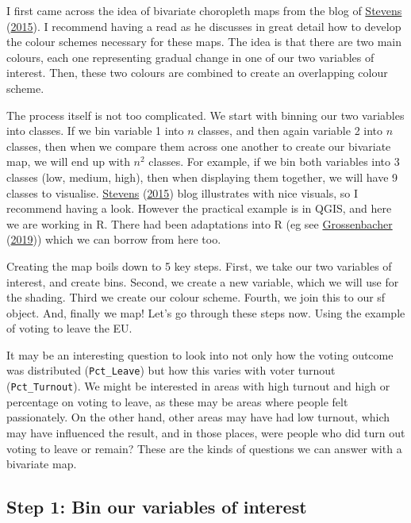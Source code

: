 \documentclass[
]{book}
\begin{document}
I first came across the idea of bivariate choropleth maps from the blog of \protect\hyperlink{ref-Stevens_2015}{Stevens} (\protect\hyperlink{ref-Stevens_2015}{2015}). I recommend having a read as he discusses in great detail how to develop the colour schemes necessary for these maps. The idea is that there are two main colours, each one representing gradual change in one of our two variables of interest. Then, these two colours are combined to create an overlapping colour scheme.

The process itself is not too complicated. We start with binning our two variables into classes. If we bin variable 1 into \(n\) classes, and then again variable 2 into \(n\) classes, then when we compare them across one another to create our bivariate map, we will end up with \(n^2\) classes. For example, if we bin both variables into 3 classes (low, medium, high), then when displaying them together, we will have 9 classes to visualise. \protect\hyperlink{ref-Stevens_2015}{Stevens} (\protect\hyperlink{ref-Stevens_2015}{2015}) blog illustrates with nice visuals, so I recommend having a look. However the practical example is in QGIS, and here we are working in R. There had been adaptations into R (eg see \protect\hyperlink{ref-Grossenbacher_2019}{Grossenbacher} (\protect\hyperlink{ref-Grossenbacher_2019}{2019})) which we can borrow from here too.

Creating the map boils down to 5 key steps. First, we take our two variables of interest, and create bins. Second, we create a new variable, which we will use for the shading. Third we create our colour scheme. Fourth, we join this to our sf object. And, finally we map! Let's go through these steps now. Using the example of voting to leave the EU.

It may be an interesting question to look into not only how the voting outcome was distributed (\texttt{Pct\_Leave}) but how this varies with voter turnout (\texttt{Pct\_Turnout}). We might be interested in areas with high turnout and high or percentage on voting to leave, as these may be areas where people felt passionately. On the other hand, other areas may have had low turnout, which may have influenced the result, and in those places, were people who did turn out voting to leave or remain? These are the kinds of questions we can answer with a bivariate map.

\hypertarget{step-1-bin-our-variables-of-interest}{%
\subsection{Step 1: Bin our variables of interest}\label{step-1-bin-our-variables-of-interest}}
\end{document}
